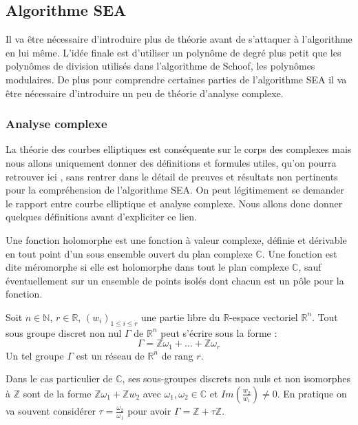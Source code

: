 \documentclass[12pt]{article}
\begin{document}
\subsection{Algorithme SEA}
Il va être nécessaire d'introduire plus de théorie avant de s'attaquer à l'algorithme en lui même. L'idée finale est d'utiliser un polynôme de degré plus petit que les polynômes de division utilisés dans l'algorithme de Schoof, les polynômes modulaires. De plus pour comprendre certaines parties de l'algorithme SEA il va être nécessaire d'introduire un peu de théorie d'analyse complexe.


\subsubsection{Analyse complexe}
La théorie des courbes elliptiques est conséquente sur le corps des complexes mais nous allons uniquement donner des définitions et formules utiles, qu'on pourra retrouver ici \cite{complexbook} \cite{csi}, sans rentrer dans le détail de preuves et résultats non pertinents pour la compréhension de l'algorithme SEA. On peut légitimement se demander le rapport entre courbe elliptique et analyse complexe. Nous allons donc donner quelques définitions avant d'expliciter ce lien.

\begin{defi}
Une fonction holomorphe est une fonction à valeur complexe, définie et dérivable en tout point d'un sous ensemble ouvert du plan complexe $\mathbb{C}$. Une fonction est dite méromorphe si elle est holomorphe dans tout le plan complexe $\mathbb{C}$, sauf éventuellement sur un ensemble de points isolés dont chacun est un pôle pour la fonction.
\end{defi}

\begin{prop}
Soit $n \in \mathbb{N}$, $r \in \mathbb{R}$, $(w_i)_{1 \leq i \leq r}$ une partie libre du $\mathbb{R}$-espace vectoriel $\mathbb{R}^n$. Tout sous groupe discret non nul $\Gamma$ de $\mathbb{R}^n$ peut s'écrire sous la forme :
\begin{equation*}
\Gamma = \mathbb{Z} \omega_1 + \ldots + \mathbb{Z} \omega_r
\end{equation*}
Un tel groupe $\Gamma$ est un réseau de $\mathbb{R}^n$ de rang $r$.
\end{prop}
Dans le cas particulier de $\mathbb{C}$, ses sous-groupes discrets non nuls et non isomorphes à $\mathbb{Z}$ sont de la forme $\mathbb{Z}\omega_1 + \mathbb{Z}w_2$ avec $\omega_1, \omega_2 \in \mathbb{C}$ et $Im(\frac{w_2}{w_1}) \ne 0$. En pratique on va souvent considérer $\tau = \frac{\omega_2}{\omega_1}$ pour avoir $\Gamma = \mathbb{Z} + \tau \mathbb{Z}$.
\end{document}
